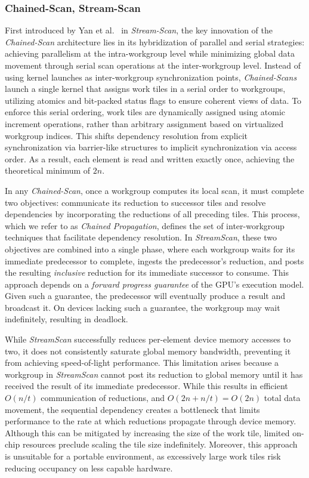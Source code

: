 \documentclass[sigconf]{acmart}
\begin{document}
\subsubsection{Chained-Scan, Stream-Scan}
First introduced by Yan et al.~\cite{10.1145/2442516.2442539} in \emph{Stream-Scan}, the key innovation of the \emph{Chained-Scan} architecture lies in its hybridization of parallel and serial strategies: achieving parallelism at the intra-workgroup level while minimizing global data movement through serial scan operations at the inter-workgroup level. Instead of using kernel launches as inter-workgroup synchronization points, \emph{Chained-Scans} launch a single kernel that assigns work tiles in a serial order to workgroups, utilizing atomics and bit-packed status flags to ensure coherent views of data. To enforce this serial ordering, work tiles are dynamically assigned using atomic increment operations, rather than arbitrary assignment based on virtualized workgroup indices. This shifts dependency resolution from explicit synchronization via barrier-like structures to implicit synchronization via access order. As a result, each element is read and written exactly once, achieving the theoretical minimum of $2n$.

In any \emph{Chained-Scan}, once a workgroup computes its local scan, it must complete two objectives: communicate its reduction to successor tiles and resolve dependencies by incorporating the reductions of all preceding tiles. This process, which we refer to as \emph{Chained Propagation}, defines the set of inter-workgroup techniques that facilitate dependency resolution. In \emph{StreamScan}, these two objectives are combined into a single phase, where each workgroup waits for its immediate predecessor to complete, ingests the predecessor's reduction, and posts the resulting \emph{inclusive} reduction for its immediate successor to consume. This approach depends on a \emph{forward progress guarantee} of the GPU's execution model. Given such a guarantee, the predecessor will eventually produce a result and broadcast it. On devices lacking such a guarantee, the workgroup may wait indefinitely, resulting in deadlock.

While \emph{StreamScan} successfully reduces per-element device memory accesses to two, it does not consistently saturate global memory bandwidth, preventing it from achieving speed-of-light performance. This limitation arises because a workgroup in \emph{StreamScan} cannot post its reduction to global memory until it has received the result of its immediate predecessor. While this results in efficient $O(n/t)$ communication of reductions, and $O(2n+ n/t)= O(2n)$ total data movement, the sequential dependency creates a bottleneck that limits performance to the rate at which reductions propagate through device memory. Although this can be mitigated by increasing the size of the work tile, limited on-chip resources preclude scaling the tile size indefinitely. Moreover, this approach is unsuitable for a portable environment, as excessively large work tiles risk reducing occupancy on less capable hardware.
\end{document}
